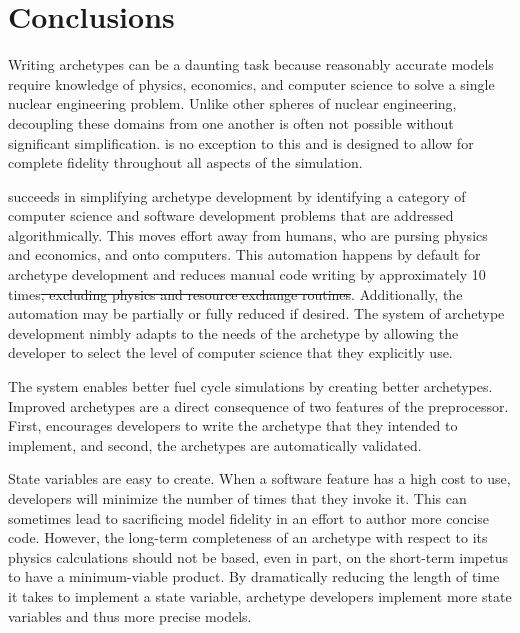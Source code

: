 \section{Conclusions}
\label{sec-conc}

Writing archetypes can be a daunting task because reasonably accurate models 
require knowledge of physics, economics, and computer science to solve a single nuclear engineering 
problem.  Unlike other spheres of nuclear engineering, decoupling these domains from
one another is often not possible without significant simplification. \cyclus is 
no exception to this and is designed to allow for complete fidelity throughout 
all aspects of the simulation. 

\Cyclus succeeds in simplifying archetype development by identifying a category 
of computer science and software development problems that are addressed 
algorithmically. This moves effort away from humans, who are pursing physics and
economics, and onto computers. This automation happens by default for
archetype development and reduces manual code writing by approximately
10 times\sout{, excluding physics and resource exchange
routines}.
Additionally, the automation may be partially or fully reduced 
if desired. The \cyclus system of archetype development nimbly 
adapts to the needs of the archetype by allowing the developer to select the 
level of computer science that they explicitly use.  

The \cyclus system enables better fuel cycle simulations by creating better 
archetypes.  Improved archetypes are a direct consequence of two features of the preprocessor. First, 
\cyclus encourages developers to write the archetype
that they intended to implement, and second, the archetypes are automatically
validated.

State variables are easy to create. When a software feature has a high cost to use,
developers will minimize the number of times that they invoke it. This can 
sometimes lead to sacrificing model fidelity in an effort to author more concise
code. However, the long-term completeness of an archetype
with respect to its physics calculations should not be based, even in part, on the
short-term impetus to have a minimum-viable product. By dramatically reducing the 
length of time it takes to implement a state variable, archetype developers implement
more state variables and thus more precise models.

